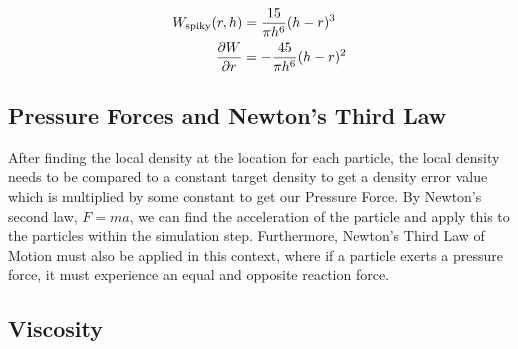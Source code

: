 \documentclass[write-up.tex]{subfiles}
\begin{document}
\begin{align*}
W_{\text{spiky}}(r, h) &= \displaystyle \frac{15}{\pi h^6} (h-r)^3 \\
\pdv{W}{r} &= -\frac{45}{\pi h^6} (h-r)^2
\end{align*}

\subsection{Pressure Forces and Newton's Third Law}

After finding the local density at the location for each particle, the local density needs to be compared to a constant target density to get a density error value which is multiplied by some constant to get our Pressure Force. By Newton's second law, $F = ma$, we can find the acceleration of the particle and apply this to the particles within the simulation step. Furthermore, Newton's Third Law of Motion must also be applied in this context, where if a particle exerts a pressure force, it must experience an equal and opposite reaction force.

\subsection{Viscosity}
\end{document}
